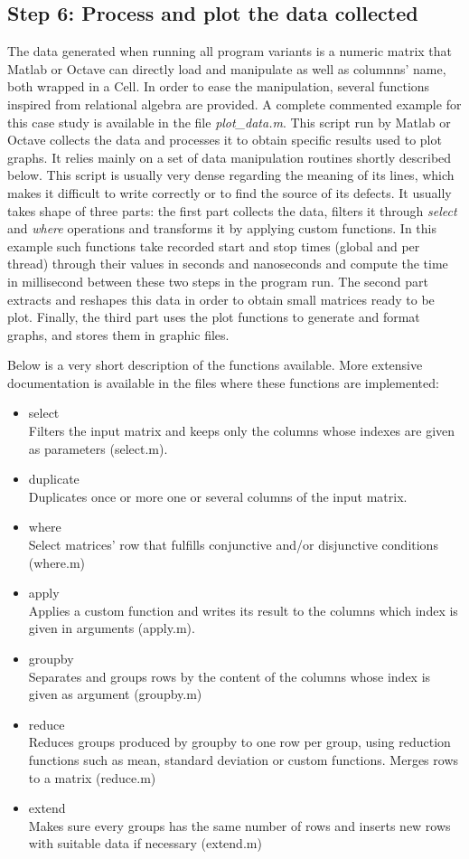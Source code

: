 \subsection{Step 6: Process and plot the data collected}
\label{sec:format}
The data generated when running all program variants is a numeric matrix that Matlab or Octave can directly load and manipulate as well as columnns' name, both wrapped in a Cell. In order to ease the manipulation, several functions inspired from relational algebra are provided. A complete commented example for this case study is available in the file \emph{plot\_data.m}. This script run by Matlab or Octave collects the data and processes it to obtain specific results used to plot graphs. It relies mainly on a set of data manipulation routines shortly described below. This script is usually very dense regarding the meaning of its lines, which makes it difficult to write correctly or to find the source of its defects. It usually takes shape of three parts: the first part collects the data, filters it through \emph{select} and \emph{where} operations and transforms it by applying custom functions. In this example such functions take recorded start and stop times (global and per thread) through their values in seconds and nanoseconds and compute the time in millisecond between these two steps in the program run. The second part extracts and reshapes this data in order to obtain small matrices ready to be plot. Finally, the third part uses the plot functions to generate and format graphs, and stores them in graphic files.

Below is a very short description of the functions available. More extensive documentation is available in the files where these functions are implemented:
\begin{itemize}
\item select\\
Filters the input matrix and keeps only the columns whose indexes are given as parameters (select.m).
\item duplicate\\ 
Duplicates once or more one or several columns of the input matrix.
\item where\\
Select matrices' row that fulfills conjunctive and/or disjunctive conditions (where.m)
\item apply\\
Applies a custom function and writes its result to the columns which index is given in arguments (apply.m).
\item groupby\\
Separates and groups rows by the content of the columns whose index is given as argument (groupby.m)
\item reduce\\
Reduces groups produced by groupby to one row per group, using reduction functions such as mean, standard deviation or custom functions. Merges rows to a matrix (reduce.m)
\item extend\\
Makes sure every groups has the same number of rows and inserts new rows with suitable data if necessary (extend.m)
\end{itemize}

